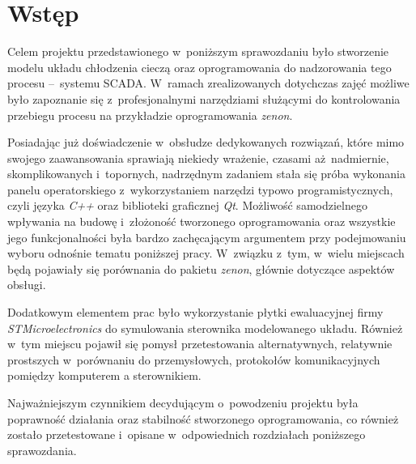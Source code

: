 \section{Wstęp}
\indent

Celem projektu przedstawionego w~poniższym sprawozdaniu było stworzenie modelu
układu chłodzenia cieczą oraz oprogramowania do nadzorowania tego procesu
--~systemu SCADA. W~ramach zrealizowanych dotychczas zajęć możliwe było
zapoznanie się z~profesjonalnymi narzędziami służącymi do kontrolowania
przebiegu procesu na przykładzie oprogramowania \textit{zenon}.

Posiadając już doświadczenie w~obsłudze dedykowanych rozwiązań, które mimo
swojego zaawansowania sprawiają niekiedy wrażenie, czasami aż nadmiernie,
skomplikowanych i~topornych, nadrzędnym zadaniem stała się próba wykonania
panelu operatorskiego z~wykorzystaniem narzędzi typowo programistycznych, czyli
języka \textit{C++} oraz biblioteki graficznej \textit{Qt}. Możliwość
samodzielnego wpływania na budowę i~złożoność tworzonego oprogramowania oraz
wszystkie jego funkcjonalności była bardzo zachęcającym argumentem przy
podejmowaniu wyboru odnośnie tematu poniższej pracy. W~związku z~tym, w~wielu
miejscach będą pojawiały się porównania do pakietu \textit{zenon}, głównie
dotyczące aspektów obsługi.

Dodatkowym elementem prac było wykorzystanie płytki ewaluacyjnej firmy
\textit{STMicroelectronics} do symulowania sterownika modelowanego układu.
Również w~tym miejscu pojawił się pomysł przetestowania alternatywnych,
relatywnie prostszych w~porównaniu do przemysłowych, protokołów komunikacyjnych
pomiędzy komputerem a sterownikiem.

Najważniejszym czynnikiem decydującym o~powodzeniu projektu była poprawność
działania oraz stabilność stworzonego oprogramowania, co również zostało
przetestowane i~opisane w~odpowiednich rozdziałach poniższego sprawozdania.
